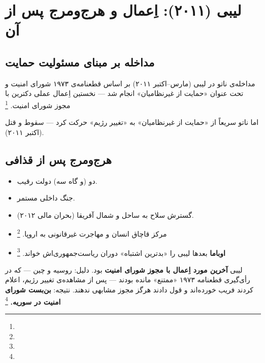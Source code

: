 \section{لیبی (۲۰۱۱): اِعمال \texorpdfstring{}{R2P} و هرج‌ومرج پس از آن}
\label{sec:ch10-libya}

\subsection{مداخله بر مبنای مسئولیت حمایت}

مداخله‌ی ناتو در لیبی (مارس–اکتبر ۲۰۱۱) بر اساس قطعنامه‌ی ۱۹۷۳ شورای امنیت و تحت عنوان «حمایت از غیرنظامیان» انجام شد — نخستین اِعمال عملی دکترین  با مجوز شورای امنیت.%
\footnote{}

اما ناتو سریعاً از «حمایت از غیرنظامیان» به «تغییر رژیم» حرکت کرد — سقوط و قتل  (اکتبر ۲۰۱۱).

\subsection{هرج‌ومرج پس از قذافی}

\begin{tcolorbox}[failbox, title={لیبی پس از ۲۰۱۱: دولت شکست‌خورده}]
\begin{itemize}[nosep, rightmargin=1em]
  \item دو (و گاه سه) دولت رقیب.
  \item جنگ داخلی مستمر.
  \item گسترش سلاح به ساحل و شمال آفریقا (بحران مالی ۲۰۱۲).
  \item مرکز قاچاق انسان و مهاجرت غیرقانونی به اروپا.%
  \footnote{}
  \item \textbf{اوباما} بعدها لیبی را «بدترین اشتباه» دوران ریاست‌جمهوری‌اش خواند.%
  \footnote{}
\end{itemize}
\end{tcolorbox}

\begin{tcolorbox}[defbox, title={لیبی و بحران \lr{R2P}}]
لیبی \textbf{آخرین مورد اِعمال  با مجوز شورای امنیت} بود. دلیل: روسیه و چین — که در رأی‌گیری قطعنامه ۱۹۷۳ «ممتنع» مانده بودند — پس از مشاهده‌ی تغییر رژیم، اعلام کردند فریب خورده‌اند و قول دادند هرگز مجوز مشابهی ندهند. نتیجه: \textbf{بن‌بست شورای امنیت در سوریه.}%
\footnote{}
\end{tcolorbox}

